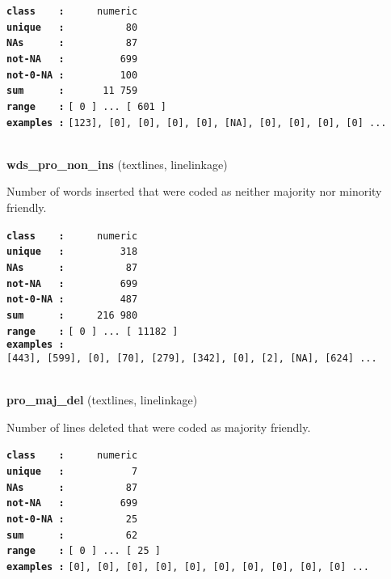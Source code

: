 \documentclass[]{article}
\begin{document}
\textbf{\texttt{class\ \ \ \ :}} \texttt{~~~~~numeric}\\
\textbf{\texttt{unique\ \ \ :}} \texttt{~~~~~~~~~~80}\\
\textbf{\texttt{NAs\ \ \ \ \ \ :}} \texttt{~~~~~~~~~~87}\\
\textbf{\texttt{not-NA\ \ \ :}} \texttt{~~~~~~~~~699}\\
\textbf{\texttt{not-0-NA\ :}} \texttt{~~~~~~~~~100}\\
\textbf{\texttt{sum\ \ \ \ \ \ :}} \texttt{~~~~~~11~759}\\
\textbf{\texttt{range\ \ \ \ :}}
\texttt{{[}\ 0\ {]}\ ...\ {[}\ 601\ {]}}\\
\textbf{\texttt{examples\ :}}
\texttt{{[}123{]},\ {[}0{]},\ {[}0{]},\ {[}0{]},\ {[}0{]},\ {[}NA{]},\ {[}0{]},\ {[}0{]},\ {[}0{]},\ {[}0{]}\ ...}\\

~

\textbf{wds\_pro\_non\_ins} (textlines, linelinkage)

Number of words inserted that were coded as neither majority nor
minority friendly.

\textbf{\texttt{class\ \ \ \ :}} \texttt{~~~~~numeric}\\
\textbf{\texttt{unique\ \ \ :}} \texttt{~~~~~~~~~318}\\
\textbf{\texttt{NAs\ \ \ \ \ \ :}} \texttt{~~~~~~~~~~87}\\
\textbf{\texttt{not-NA\ \ \ :}} \texttt{~~~~~~~~~699}\\
\textbf{\texttt{not-0-NA\ :}} \texttt{~~~~~~~~~487}\\
\textbf{\texttt{sum\ \ \ \ \ \ :}} \texttt{~~~~~216~980}\\
\textbf{\texttt{range\ \ \ \ :}}
\texttt{{[}\ 0\ {]}\ ...\ {[}\ 11182\ {]}}\\
\textbf{\texttt{examples\ :}}
\texttt{{[}443{]},\ {[}599{]},\ {[}0{]},\ {[}70{]},\ {[}279{]},\ {[}342{]},\ {[}0{]},\ {[}2{]},\ {[}NA{]},\ {[}624{]}\ ...}\\

~

\textbf{pro\_maj\_del} (textlines, linelinkage)

Number of lines deleted that were coded as majority friendly.

\textbf{\texttt{class\ \ \ \ :}} \texttt{~~~~~numeric}\\
\textbf{\texttt{unique\ \ \ :}} \texttt{~~~~~~~~~~~7}\\
\textbf{\texttt{NAs\ \ \ \ \ \ :}} \texttt{~~~~~~~~~~87}\\
\textbf{\texttt{not-NA\ \ \ :}} \texttt{~~~~~~~~~699}\\
\textbf{\texttt{not-0-NA\ :}} \texttt{~~~~~~~~~~25}\\
\textbf{\texttt{sum\ \ \ \ \ \ :}} \texttt{~~~~~~~~~~62}\\
\textbf{\texttt{range\ \ \ \ :}}
\texttt{{[}\ 0\ {]}\ ...\ {[}\ 25\ {]}}\\
\textbf{\texttt{examples\ :}}
\texttt{{[}0{]},\ {[}0{]},\ {[}0{]},\ {[}0{]},\ {[}0{]},\ {[}0{]},\ {[}0{]},\ {[}0{]},\ {[}0{]},\ {[}0{]}\ ...}\\
\end{document}
